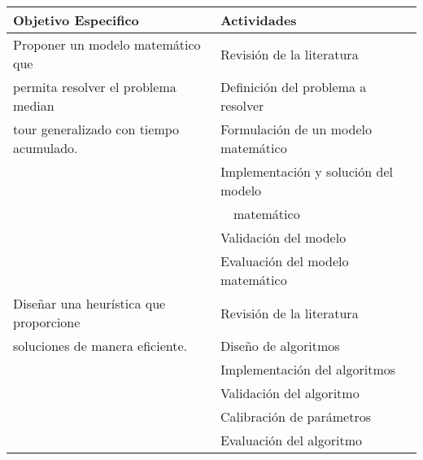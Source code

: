 \begin{table}[H]
\begin{center}
\begin{tabular}{ll}
\hline
Objetivo Especifico                                                                                   & Actividades                                     \\ \hline
Proponer un modelo matemático que														    		  & Revisión de la literatura                       \\
permita resolver el problema median                                                                   & Definición del problema a resolver              \\
tour generalizado con tiempo acumulado.                                                               & Formulación de un modelo matemático             \\
                                                                                                      & Implementación y solución del modelo            \\
																									  & $\quad$matemático \\
                                                                                                      & Validación del modelo                           \\
                                                                                                      & Evaluación del modelo matemático                \\ \hline
Diseñar una heurística que proporcione                                                                & Revisión de la literatura                       \\
soluciones de manera eficiente.                                                                       & Diseño de algoritmos                            \\
                                                                                                      & Implementación del algoritmos                   \\
                                                                                                      & Validación del algoritmo                        \\
                                                                                                      & Calibración de parámetros                       \\
                                                                                                      & Evaluación del algoritmo                        \\ \hline

\end{tabular}
\end{center}
\end{table}
